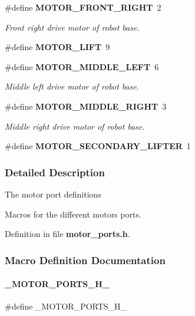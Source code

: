 \begin{DoxyCompactItemize}
\#define \textbf{ M\+O\+T\+O\+R\+\_\+\+F\+R\+O\+N\+T\+\_\+\+R\+I\+G\+HT}~2
\begin{DoxyCompactList}\small\item\em Front right drive motor of robot base. \end{DoxyCompactList}\item 
\#define \textbf{ M\+O\+T\+O\+R\+\_\+\+L\+I\+FT}~9
\item 
\#define \textbf{ M\+O\+T\+O\+R\+\_\+\+M\+I\+D\+D\+L\+E\+\_\+\+L\+E\+FT}~6
\begin{DoxyCompactList}\small\item\em Middle left drive motor of robot base. \end{DoxyCompactList}\item 
\#define \textbf{ M\+O\+T\+O\+R\+\_\+\+M\+I\+D\+D\+L\+E\+\_\+\+R\+I\+G\+HT}~3
\begin{DoxyCompactList}\small\item\em Middle right drive motor of robot base. \end{DoxyCompactList}\item 
\#define \textbf{ M\+O\+T\+O\+R\+\_\+\+S\+E\+C\+O\+N\+D\+A\+R\+Y\+\_\+\+L\+I\+F\+T\+ER}~1
\end{DoxyCompactItemize}


\subsubsection{Detailed Description}
The motor port definitions

Macros for the different motors ports. 



Definition in file \textbf{ motor\+\_\+ports.\+h}.



\subsubsection{Macro Definition Documentation}
\mbox{\label{motor__ports_8h_a96b0e64c39730b0c4ca0d9e493bc0f58}} 
\paragraph{\+\_\+\+M\+O\+T\+O\+R\+\_\+\+P\+O\+R\+T\+S\+\_\+\+H\+\_\+}
{\footnotesize\ttfamily \#define \+\_\+\+M\+O\+T\+O\+R\+\_\+\+P\+O\+R\+T\+S\+\_\+\+H\+\_\+}



